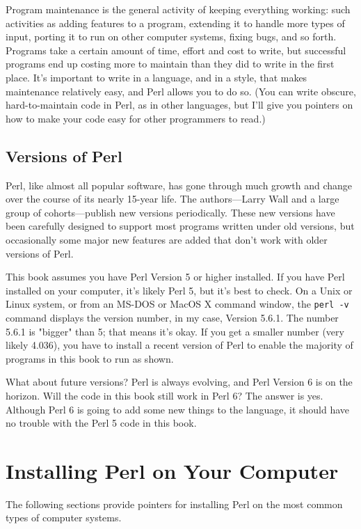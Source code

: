 Program maintenance is the general activity of keeping everything working: such activities as adding features to a program, extending it to handle more types of input, porting it to run on other computer systems, fixing bugs, and so forth. Programs take a certain amount of time, effort and cost to write, but successful programs end up costing more to maintain than they did to write in the first place. It's important to write in a language, and in a style, that makes maintenance relatively easy, and Perl allows you to do so. (You can write obscure, hard-to-maintain code in Perl, as in other languages, but I'll give you pointers on how to make your code easy for other programmers to read.)

\subsection{Versions of Perl}
Perl, like almost all popular software, has gone through much growth and change over the course of its nearly 15-year life. The authors—Larry Wall and a large group of cohorts—publish new versions periodically. These new versions have been carefully designed to support most programs written under old versions, but occasionally some major new features are added that don't work with older versions of Perl.

This book assumes you have Perl Version 5 or higher installed. If you have Perl installed on your computer, it's likely Perl 5, but it's best to check. On a Unix or Linux system, or from an MS-DOS or MacOS X command window, the \verb|perl -v| command displays the version number, in my case, Version 5.6.1. The number 5.6.1 is "bigger" than 5; that means it's okay. If you get a smaller number (very likely 4.036), you have to install a recent version of Perl to enable the majority of programs in this book to run as shown.

What about future versions? Perl is always evolving, and Perl Version 6 is on the horizon. Will the code in this book still work in Perl 6? The answer is yes. Although Perl 6 is going to add some new things to the language, it should have no trouble with the Perl 5 code in this book. 

\section{Installing Perl on Your Computer}
The following sections provide pointers for installing Perl on the most common types of computer systems.

